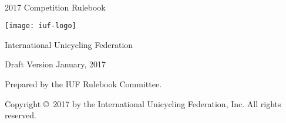 \begin{titlepage}
\centering
\ \\
\vspace{5cm}
{\Huge 2017 Competition Rulebook}
\vspace{5mm}

\texttt{[image: iuf-logo]}

\vspace{5mm}
{\huge International Unicycling Federation}

\vspace{5mm}
{\Large Draft Version \quad January, 2017}

\vspace{50mm}
Prepared by the IUF Rulebook Committee.

\vspace{5mm}
{\small Copyright \copyright\ 2017 by the International Unicycling Federation, Inc. All rights reserved.}

\end{titlepage}
